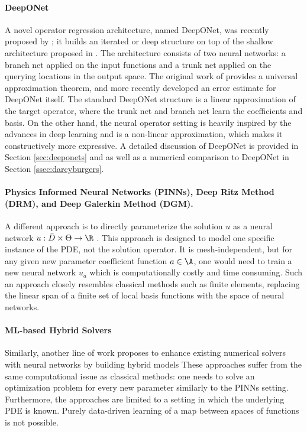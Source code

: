 \paragraph{DeepONet}
A novel operator regression architecture, named DeepONet, was recently proposed by \cite{lu2019deeponet, lu2021learning}; it builds an iterated or deep structure on top
of the shallow architecture proposed in \cite{chen1995universal}. The architecture consists of two neural networks: a branch net applied on the input functions and a trunk net applied on the querying locations in the output space. The original work of \cite{chen1995universal}
provides a universal approximation theorem, and more recently \cite{lanthaler2021error} developed an error estimate for DeepONet itself.
The standard DeepONet structure is a linear approximation of the target operator, where the trunk net and branch net learn the coefficients and basis. On the other hand, the neural operator setting is heavily inspired by the advances in deep learning and is a non-linear approximation, which makes it constructively more expressive. A detailed discussion of DeepONet is provided in Section \ref{sec:deeponets} and as well as a numerical comparison to DeepONet in Section \ref{ssec:darcyburgers}.

\paragraph{Physics Informed Neural Networks (PINNs), Deep Ritz Method (DRM), and Deep Galerkin Method (DGM).}
A different approach is to directly parameterize the solution \(u\) as a neural network \(u : \bar{D} \times \Theta \to \R\) 
\citep{Weinan, raissi2019physics,sirignano2018dgm,bar2019unsupervised,smith2020eikonet,pan2020physics,beck2021solving}. This approach is designed to model one specific instance of the PDE, not the solution operator. It is mesh-independent, but for any given  new parameter coefficient function \(a \in \A\), one would need to train a new neural network \(u_a\) which is computationally costly and time consuming. Such an approach closely resembles classical methods such as finite elements, replacing the linear span of a finite set of local basis functions with the space of neural networks. 

\paragraph{ML-based Hybrid Solvers}
Similarly, another line of work proposes to enhance existing numerical solvers with neural networks by building hybrid models \citep{pathak2020using, um2020solver, greenfeld2019learning}
These approaches suffer from the same computational issue as classical methods: one needs to solve an optimization problem for every new parameter similarly to the PINNs setting. Furthermore, the approaches are limited to a setting in which the underlying PDE is known. Purely data-driven learning of a map between spaces of functions is not possible. 


